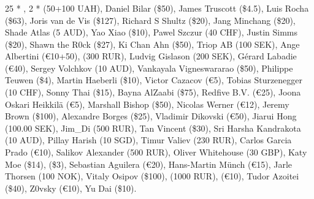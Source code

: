 \subsubsection*{}

25 * , 
2 *  (50+100 UAH), 
Daniel Bilar (\$50), 
James Truscott (\$4.5),
Luis Rocha (\$63), 
Joris van de Vis (\$127), 
Richard S Shultz (\$20), 
Jang Minchang (\$20), 
Shade Atlas (5 AUD), 
Yao Xiao (\$10),
Pawel Szczur (40 CHF), 
Justin Simms (\$20), 
Shawn the R0ck (\$27), 
Ki Chan Ahn (\$50), 
Triop AB (100 SEK), 
Ange Albertini (\euro{}10+50),
 (300 RUR), 
Ludvig Gislason (200 SEK), 
Gérard Labadie (\euro{}40), 
Sergey Volchkov (10 AUD),
Vankayala Vigneswararao (\$50),
Philippe Teuwen (\$4),
Martin Haeberli (\$10),
Victor Cazacov (\euro{}5),
Tobias Sturzenegger (10 CHF),
Sonny Thai (\$15),
Bayna AlZaabi (\$75),
Redfive B.V. (\euro{}25),
Joona Oskari Heikkilä (\euro{}5),
Marshall Bishop (\$50),
Nicolas Werner (\euro{}12),
Jeremy Brown (\$100),
Alexandre Borges (\$25),
Vladimir Dikovski (\euro{}50),
Jiarui Hong (100.00 SEK),
Jim\_Di (500 RUR),
Tan Vincent (\$30),
Sri Harsha Kandrakota (10 AUD),
Pillay Harish (10 SGD),
Timur Valiev (230 RUR),
Carlos Garcia Prado (\euro{}10),
Salikov Alexander (500 RUR),
Oliver Whitehouse (30 GBP),
Katy Moe (\$14),
 (\$3),
Sebastian Aguilera (\euro{}20),
Hans-Martin Münch (\euro{}15),
Jarle Thorsen (100 NOK),
Vitaly Osipov (\$100),
 (1000 RUR),
 (\euro{}10),
Tudor Azoitei (\$40),
Z0vsky (\euro{}10),
Yu Dai (\$10). 

